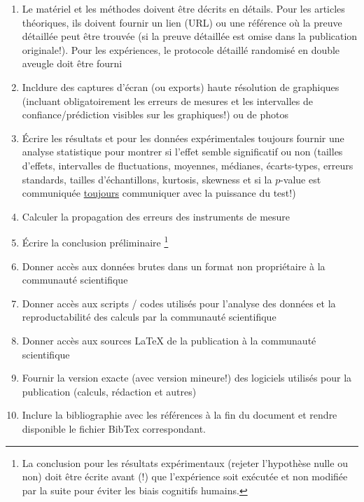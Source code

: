 \begin{enumerate}
		\item Le matériel et les méthodes doivent être décrits en détails. Pour les articles théoriques, ils doivent fournir un lien (URL) ou une référence où la preuve détaillée peut être trouvée (si la preuve détaillée est omise dans la publication originale!). Pour les expériences, le protocole détaillé randomisé en double aveugle doit être fourni
		
		\item Incldure des captures d'écran (ou exports) haute résolution de graphiques (incluant obligatoirement les erreurs de mesures et les intervalles de confiance/prédiction visibles sur les graphiques!) ou de photos
		
		\item Écrire les résultats et pour les données expérimentales toujours fournir une analyse statistique pour montrer si l'effet semble significatif ou non (tailles d'effets, intervalles de fluctuations, moyennes, médianes, écarts-types, erreurs standards, tailles d'échantillons, kurtosis, skewness et si la $p$-value est communiquée \underline{toujours} communiquer avec la puissance du test!)
		
		\item Calculer la propagation des erreurs des instruments de mesure
		
		\item Écrire la conclusion préliminaire \footnote{La conclusion pour les résultats expérimentaux (rejeter l'hypothèse nulle ou non) doit être écrite avant (!) que l'expérience soit exécutée et non modifiée par la suite pour éviter les biais cognitifs humains.}
		
		\item Donner accès aux données brutes dans un format non propriétaire à la communauté scientifique
		
		\item Donner accès aux scripts / codes utilisés pour l'analyse des données et la reproductabilité des calculs par la communauté scientifique
		
		\item Donner accès aux sources \LaTeX{} de la publication à la communauté scientifique
		
		\item Fournir la version exacte (avec version mineure!) des logiciels utilisés pour la publication (calculs, rédaction et autres)
		
		\item Inclure la bibliographie avec les références à la fin du document et rendre disponible le fichier BibTex correspondant.
		

\end{enumerate}
